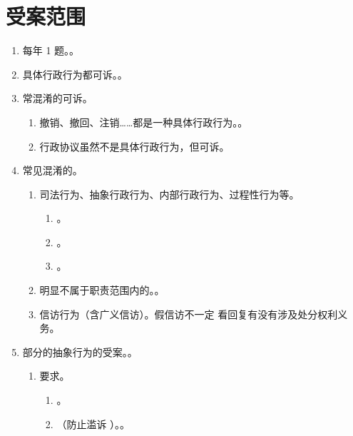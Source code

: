\section{受案范围}
\begin{enumerate}
  \item 每年 1 题。。
  \item 具体行政行为都可诉。。
  \item 常混淆的可诉。
        \begin{enumerate}
          \item 撤销、撤回、注销……都是一种具体行政行为。。
          \item 行政协议虽然不是具体行政行为，但可诉。
        \end{enumerate}
  \item 常见混淆的。
        \begin{enumerate}
          \item 司法行为、抽象行政行为、内部行政行为、过程性行为等。
                \begin{enumerate}
                  \item {}。
                  \item {}。
                  \item {} \yjt {}。
                \end{enumerate}
          \item 明显不属于职责范围内的。。
          \item 信访行为（含广义信访）。假信访不一定 \yjt 看回复有没有涉及处分权利义务。
        \end{enumerate}
  \item 部分的抽象行为的受案。。
        \begin{enumerate}
          \item 要求。
                \begin{enumerate}
                  \item {}。
                  \item {}（防止滥诉 \yjt {}）。。

\end{enumerate}
\end{enumerate}
\end{enumerate}
